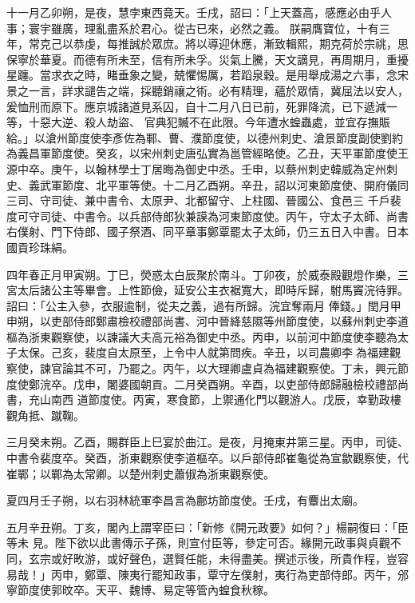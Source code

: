 \begin{pinyinscope}
 十一月乙卯朔，是夜，慧孛東西竟天。壬戌，詔曰：「上天蓋高，感應必由乎人事；寰宇雖廣，理亂盡系於君心。從古已來，必然之義。
 朕嗣膺寶位，十有三年，常克己以恭虔，每推誠於眾庶。將以導迎休應，漸致輯熙，期克荷於宗祧，思保寧於華夏。而德有所未至，信有所未孚。災氣上騰，天文謫見，再周期月，重擾星躔。當求衣之時，睹垂象之變，兢懼惕厲，若蹈泉穀。是用舉成湯之六事，念宋景之一言，詳求譴告之端，採聽銷禳之術。必有精理，蘊於眾情，冀屈法以安人，爰恤刑而原下。應京城諸道見系囚，自十二月八日已前，死罪降流，已下遞減一等，十惡大逆、殺人劫盜、
 官典犯贓不在此限。今年遭水蝗蟲處，並宜存撫賑給。」以滄州節度使李彥佐為鄆、曹、濮節度使，以德州刺史、滄景節度副使劉約為義昌軍節度使。癸亥，以宋州刺史唐弘實為邕管經略使。乙丑，天平軍節度使王源中卒。庚午，以翰林學士丁居晦為御史中丞。壬申，以蔡州刺史韓威為定州刺史、義武軍節度、北平軍等使。十二月乙酉朔。辛丑，詔以河東節度使、開府儀同三司、守司徒、兼中書令、太原尹、北都留守、上柱國、晉國公、食邑三
 千戶裴度可守司徒、中書令。以兵部侍郎狄兼謨為河東節度使。丙午，守太子太師、尚書右僕射、門下侍郎、國子祭酒、同平章事鄭覃罷太子太師，仍三五日入中書。日本國貢珍珠絹。



 四年春正月甲寅朔。丁巳，熒惑太白辰聚於南斗。丁卯夜，於威泰殿觀燈作樂，三宮太后諸公主等畢會。上性節儉，延安公主衣裾寬大，即時斥歸，駙馬竇浣待罪。詔曰：「公主入參，衣服逾制，從夫之義，過有所歸。浣宜奪兩月
 俸錢。」閏月甲申朔，以吏部侍郎鄭肅檢校禮部尚書、河中晉絳慈隰等州節度使，以蘇州刺史李道樞為浙東觀察使，以諫議大夫高元裕為御史中丞。丙申，以前河中節度使李聽為太子太保。己亥，裴度自太原至，上令中人就第問疾。辛丑，以司農卿李為福建觀察使，諫官論其不可，乃罷之。丙午，以大理卿盧貞為福建觀察使。丁未，興元節度使鄭浣卒。戊申，闍婆國朝貢。二月癸酉朔。辛酉，以吏部侍郎歸融檢校禮部尚書，充山南西
 道節度使。丙寅，寒食節，上禦通化門以觀游人。戊辰，幸勤政樓觀角抵、蹴鞠。



 三月癸未朔。乙酉，賜群臣上巳宴於曲江。是夜，月掩東井第三星。丙申，司徒、中書令裴度卒。癸酉，浙東觀察使李道樞卒。以戶部侍郎崔龜從為宣歙觀察使，代崔鄲；以鄲為太常卿。以楚州刺史蕭俶為浙東觀察使。



 夏四月壬子朔，以右羽林統軍李昌言為鄜坊節度使。壬戌，有麞出太廟。



 五月辛丑朔。丁亥，閣內上謂宰臣曰：「新修《開元政要》如何？」楊嗣復曰：「臣等未
 見。陛下欲以此書傳示子孫，則宣付臣等，參定可否。緣開元政事與貞觀不同，玄宗或好畋游，或好聲色，選賢任能，未得盡美。撰述示後，所貴作程，豈容易哉！」丙申，鄭覃、陳夷行罷知政事，覃守左僕射，夷行為吏部侍郎。丙午，邠寧節度使郭旼卒。天平、魏博、易定等管內蝗食秋稼。




\end{pinyinscope}
